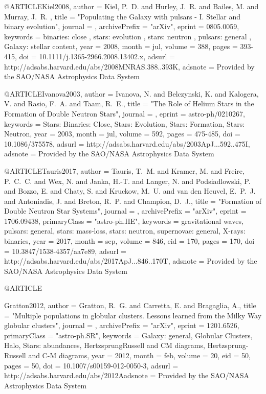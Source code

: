 \documentclass[twocolumn,tighten]{aastex63}
\begin{document}
{{{@ARTICLE{Kiel2008,
   author = {{Kiel}, P.~D. and {Hurley}, J.~R. and {Bailes}, M. and {Murray}, J.~R.
	},
    title = "{Populating the Galaxy with pulsars - I. Stellar and binary evolution}",
  journal = {\mnras},
archivePrefix = "arXiv",
   eprint = {0805.0059},
 keywords = {binaries: close , stars: evolution , stars: neutron , pulsars: general , Galaxy: stellar content},
     year = 2008,
    month = jul,
   volume = 388,
    pages = {393-415},
      doi = {10.1111/j.1365-2966.2008.13402.x},
   adsurl = {http://adsabs.harvard.edu/abs/2008MNRAS.388..393K},
  adsnote = {Provided by the SAO/NASA Astrophysics Data System}
}

@ARTICLE{Ivanova2003,
   author = {{Ivanova}, N. and {Belczynski}, K. and {Kalogera}, V. and {Rasio}, F.~A. and 
	{Taam}, R.~E.},
    title = "{The Role of Helium Stars in the Formation of Double Neutron Stars}",
  journal = {\apj},
   eprint = {astro-ph/0210267},
 keywords = {Stars: Binaries: Close, Stars: Evolution, Stars: Formation, Stars: Neutron},
     year = 2003,
    month = jul,
   volume = 592,
    pages = {475-485},
      doi = {10.1086/375578},
   adsurl = {http://adsabs.harvard.edu/abs/2003ApJ...592..475I},
  adsnote = {Provided by the SAO/NASA Astrophysics Data System}
}

@ARTICLE{Tauris2017,
   author = {{Tauris}, T.~M. and {Kramer}, M. and {Freire}, P.~C.~C. and 
	{Wex}, N. and {Janka}, H.-T. and {Langer}, N. and {Podsiadlowski}, P. and 
	{Bozzo}, E. and {Chaty}, S. and {Kruckow}, M.~U. and {van den Heuvel}, E.~P.~J. and 
	{Antoniadis}, J. and {Breton}, R.~P. and {Champion}, D.~J.},
    title = "{Formation of Double Neutron Star Systems}",
  journal = {\apj},
archivePrefix = "arXiv",
   eprint = {1706.09438},
 primaryClass = "astro-ph.HE",
 keywords = {gravitational waves, pulsars: general, stars: mass-loss, stars: neutron, supernovae: general, X-rays: binaries},
     year = 2017,
    month = sep,
   volume = 846,
      eid = {170},
    pages = {170},
      doi = {10.3847/1538-4357/aa7e89},
   adsurl = {http://adsabs.harvard.edu/abs/2017ApJ...846..170T},
  adsnote = {Provided by the SAO/NASA Astrophysics Data System}
}

@ARTICLE{Gratton2012,
   author = {{Gratton}, R.~G. and {Carretta}, E. and {Bragaglia}, A.},
    title = "{Multiple populations in globular clusters. Lessons learned from the Milky Way globular clusters}",
  journal = {\aapr},
archivePrefix = "arXiv",
   eprint = {1201.6526},
 primaryClass = "astro-ph.SR",
 keywords = {Galaxy: general, Globular Clusters, Halo, Stars: abundances, Hertzsprung{\ndash}Russell and C{\ndash}M diagrams, Hertzsprung-Russell and C-M diagrams},
     year = 2012,
    month = feb,
   volume = 20,
      eid = {50},
    pages = {50},
      doi = {10.1007/s00159-012-0050-3},
   adsurl = {http://adsabs.harvard.edu/abs/2012Aadsnote = {Provided by the SAO/NASA Astrophysics Data System}
}

}}}}
\end{document}
